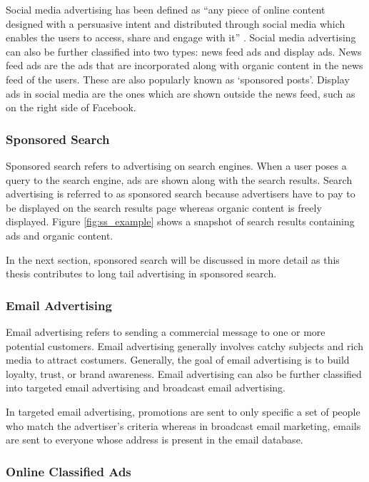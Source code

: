 Social media advertising has been defined as ``any piece of online content designed with a persuasive intent and distributed through social media which enables the users to access, share and engage with it'' \cite{alhabash2017social}. Social media advertising can also be further classified into two types: news feed ads and display ads.
News feed ads are the ads that are incorporated along with organic content in the news feed of the users. These are also popularly known as `sponsored posts'. Display ads in social media are the ones which are shown outside the news feed, such as on the right side of Facebook.




\subsubsection{Sponsored Search}
Sponsored search refers to advertising on search engines. When a user poses a query to the search engine, ads are shown along with the search results. Search advertising is referred to as sponsored search because advertisers have to pay to be displayed on the search results page whereas organic content is freely displayed. Figure \ref{fig:ss_example} shows a snapshot of search results containing ads and organic content.

In the next section, sponsored search will be discussed in more detail as this thesis contributes to long tail advertising in sponsored search.
 



\subsubsection{Email Advertising}
Email advertising refers to sending a commercial message to one or more potential customers. Email advertising generally involves catchy subjects and rich media to attract costumers. Generally, the goal of email advertising is to build loyalty, trust, or brand awareness. Email advertising can also be further classified into targeted email advertising and broadcast email advertising.


In targeted email advertising, promotions are sent to only specific a set of people who match the advertiser's criteria whereas in broadcast email marketing, emails are sent to everyone whose address is present in the email database.

\subsubsection{Online Classified Ads}

